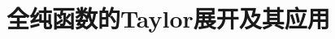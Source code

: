 \documentclass[../main.tex]{subfiles} %
\begin{document}
\chapter{全纯函数的Taylor展开及其应用}




















\end{document}
